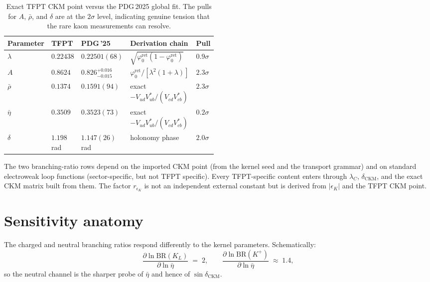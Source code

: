 \documentclass[11pt,a4paper]{article}
\theoremstyle{definition}
\theoremstyle{remark}
\newcommand{\phiz}{\varphi_{0}^{\mathrm{ret}}}
\newcommand{\BR}{\mathrm{BR}}
\numberwithin{equation}{section}
\begin{document}
\begin{table}[ht]
\centering
\small
\begin{tabularx}{\linewidth}{@{}>{\raggedright\arraybackslash}p{0.14\linewidth}>{\centering\arraybackslash}p{0.12\linewidth}>{\centering\arraybackslash}p{0.14\linewidth}>{\raggedright\arraybackslash}Y>{\centering\arraybackslash}p{0.09\linewidth}@{}}
\toprule
Parameter & TFPT & PDG\,'25 & Derivation chain & Pull \\
\midrule
$\lambda$ & $\num{0.22438}$ & $0.22501(68)$ & $\sqrt{\phiz(1-\phiz)}$ & $0.9\sigma$ \\
$A$ & $\num{0.8624}$ & $0.826^{+0.016}_{-0.015}$ & $\phiz/[\lambda^2(1+\lambda)]$ & $2.3\sigma$ \\
$\bar\rho$ & $\num{0.1374}$ & $0.1591(94)$ & exact $-V_{ud}V_{ub}^*/(V_{cd}V_{cb}^*)$ & $2.3\sigma$ \\
$\bar\eta$ & $\num{0.3509}$ & $0.3523(73)$ & exact $-V_{ud}V_{ub}^*/(V_{cd}V_{cb}^*)$ & $0.2\sigma$ \\
$\delta$ & $\num{1.198}$ rad & $1.147(26)$ rad & holonomy phase & $2.0\sigma$ \\
\bottomrule
\end{tabularx}
\caption{Exact TFPT CKM point versus the PDG\,2025 \cite{PDG2025} global fit.
The pulls for $A$, $\bar\rho$, and $\delta$ are at the $2\sigma$ level,
indicating genuine tension that the rare kaon measurements can resolve.}
\label{tab:wolfenstein}
\end{table}

The two branching-ratio rows depend on the imported CKM point
(from the kernel seed and the transport grammar) and on standard
electroweak loop functions (sector-specific, but not TFPT specific).
Every TFPT-specific content enters through $\lambda_C$,
$\delta_{\mathrm{CKM}}$, and the exact CKM matrix built from them.
The factor $r_{\epsilon_K}$ is not an independent external constant but
is derived from $|\epsilon_K|$ and the TFPT CKM point.


\section{Sensitivity anatomy}
\label{sec:sensitivity}

The charged and neutral branching ratios respond differently to the kernel
parameters. Schematically:
\begin{equation}
\label{eq:sensitivity}
\frac{\partial\ln\BR(K_L)}{\partial\ln\bar\eta}\;=\;2,
\qquad
\frac{\partial\ln\BR(K^+)}{\partial\ln\bar\eta}\;\approx\;1.4,
\end{equation}
so the neutral channel is the sharper probe of $\bar\eta$ and hence of
$\sin\delta_{\mathrm{CKM}}$.
\end{document}
